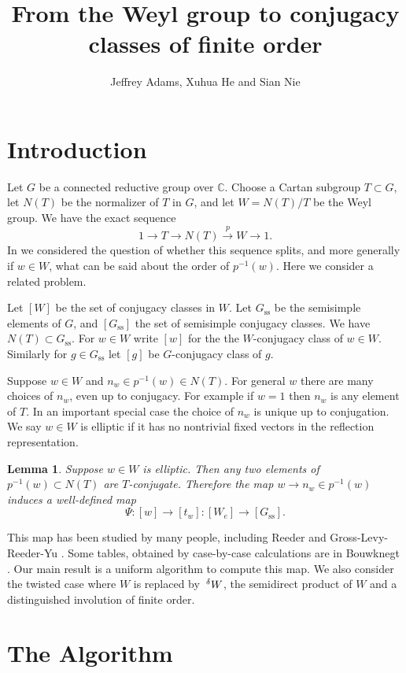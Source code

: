 \documentclass[10pt,leqno]{article}
\newtheorem{lemma}[equation]{Lemma}
\newcommand{\C}{\mathbb C}
\renewcommand{\sec}[1]{\section{#1}
\renewcommand{\theequation}{\thesection.\arabic{equation}}
  \setcounter{equation}{0}}
\newcommand\inv{^{-1}}
\newcommand{\Wconj}{[W]}
\newcommand{\Weconj}{[{W_e}]}
\newcommand{\Gssconj}{[{G_\text{ss}}]}
\renewcommand{\ss}{\text{ss}}
\newcommand{\Gss}{G_\ss}
\newcommand{\Wext}{\negthinspace\negthinspace\phantom{a}^\delta W}
\renewcommand{\sec}[1]{\section{#1}
\renewcommand{\theequation}{\thesection.\arabic{equation}}
  \setcounter{equation}{0}}
\begin{document}
\title{From the Weyl group to conjugacy classes of finite order}
\author{Jeffrey Adams, Xuhua He and Sian Nie}
\maketitle

\sec{Introduction}

Let $G$ be a connected reductive group over $\C$.
Choose a Cartan subgroup $T\subset G$, let $N(T)$ be the normalizer of $T$ in $G$,
and let $W=N(T)/T$ be the Weyl group.
We have the exact sequence
\begin{equation}
\label{e:exactW}
1\rightarrow T\rightarrow N(T)\overset p\rightarrow W\rightarrow 1.
\end{equation}
In \cite{AH} we considered the question of whether this sequence splits,
and more generally if $w\in W$, what can be said about the order of $p\inv(w)$.
Here we consider a related problem.

Let $\Wconj$ be the set of conjugacy classes in $W$. Let $\Gss$ be the
semisimple elements of $G$, and $\Gssconj$ the set of semisimple
conjugacy classes. We have $N(T)\subset \Gss$. For $w\in W$ write $[w]$ for the the $W$-conjugacy
class of $w\in W$. Similarly for $g\in \Gss$ let $[g]$ be
$G$-conjugacy class of $g$.

Suppose $w\in W$ and $n_w\in p\inv(w)\in N(T)$. For general $w$ there
are many choices of $n_w$, even up to conjugacy. For example if $w=1$
then $n_w$ is any element of $T$. In an important special case the
choice of $n_w$ is unique up to conjugation. We say $w\in W$ is elliptic
if it has no nontrivial fixed vectors in the reflection
representation.


\begin{lemma}
  \label{l:basic}
Suppose $w\in W$ is elliptic. Then any two elements of
$p\inv(w)\subset N(T)$ are $T$-conjugate. Therefore the map $w\rightarrow n_w\in p\inv(w)$ induces
a well-defined map
$$
\Psi:[w]\rightarrow [t_w]: \Weconj\rightarrow\Gssconj.
$$
\end{lemma}
This map has been studied by many people, including Reeder
\cite{reeder_torsion} and Gross-Levy-Reeder-Yu \cite{rgly}. Some
tables, obtained by case-by-case calculations are in Bouwknegt
\cite{bouwknegt}.
Our main result is a uniform algorithm to compute this map. We
also consider the twisted case where $W$ is replaced by $\Wext$, the
semidirect product of $W$ and a distinguished involution of finite
order.

\sec{The Algorithm}
\label{const}
\end{document}
